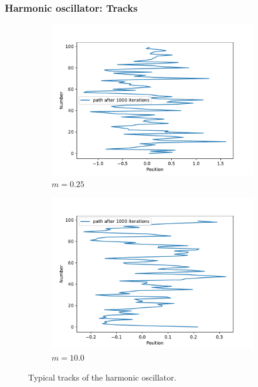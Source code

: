 \documentclass[aspectratio=169]{beamer}
\begin{document}
\begin{frame}
	\frametitle{Harmonic oscillator: Tracks}
	\vspace{-15px}
	\begin{figure}[H]
		\centering
			\begin{subfigure}[c]{0.49\textwidth}
				\includegraphics[width=\textwidth]{../imgs/harmonic_oscillator_track/track_1000100_track_1000.pdf}
				\caption{$m=0.25$}
				\label{fig:harmonic_oscillator_track_1000100_track_1000_light}
			\end{subfigure}
			\begin{subfigure}[c]{0.49\textwidth}
				\includegraphics[width=\textwidth]{../imgs/harmonic_oscillator_track/track_1000100_heavy_track_1000.pdf}
				\caption{$m=10.0$}
				\label{fig:harmonic_oscillator_track_1000100_track_1000_heavy}
			\end{subfigure}
		\caption{Typical tracks of the harmonic oscillator.}
		\label{fig:harmonic_oscillator_track_1000100_track_1000}
	\end{figure}
\end{frame}
\end{document}
